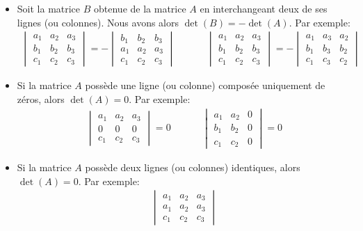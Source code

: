 \documentclass[]{book}
\theoremstyle{definition}
\theoremstyle{definition}
\theoremstyle{definition}
\theoremstyle{remark}
\begin{document}
\begin{itemize}
\item
  Soit la matrice \(B\) obtenue de la matrice \(A\) en interchangeant deux de ses lignes (ou colonnes). Nous avons alors \(\det(B)=-\det(A)\). Par exemple:
  \begin{align*}
  \begin{vmatrix}
  a_1 & a_2 & a_3 \\
  b_1 & b_2 & b_3 \\
  c_1 & c_2 & c_3
  \end{vmatrix}
  =
  -\begin{vmatrix}
  b_1 & b_2 & b_3 \\
  a_1 & a_2 & a_3 \\
  c_1 & c_2 & c_3
  \end{vmatrix}
  &
  \phantom{aaa}
  &
  \begin{vmatrix}
  a_1 & a_2 & a_3 \\
  b_1 & b_2 & b_3 \\
  c_1 & c_2 & c_3
  \end{vmatrix}
  =
  -\begin{vmatrix}
  a_1 & a_3 & a_2 \\
  b_1 & b_3 & b_2 \\
  c_1 & c_3 & c_2
  \end{vmatrix}
  \end{align*}
\item
  Si la matrice \(A\) possède une ligne (ou colonne) composée uniquement de zéros, alors \(\det(A)=0\). Par exemple:
  \begin{align*}
  \begin{vmatrix}
  a_1 & a_2 & a_3 \\
  0 & 0 & 0 \\
  c_1 & c_2 & c_3
  \end{vmatrix}
  =
  0
  &
  \phantom{aaa}
  &
  \begin{vmatrix}
  a_1 & a_2 & 0 \\
  b_1 & b_2 & 0 \\
  c_1 & c_2 & 0
  \end{vmatrix}
  =0
  \end{align*}
\item
  Si la matrice \(A\) possède deux lignes (ou colonnes) identiques, alors \(\det(A)=0\). Par exemple:
  \begin{align*}
  \begin{vmatrix}
  a_1 & a_2 & a_3 \\
  a_1 & a_2 & a_3 \\
  c_1 & c_2 & c_3
  \end{vmatrix}

\end{align*}
\end{itemize}
\end{document}
